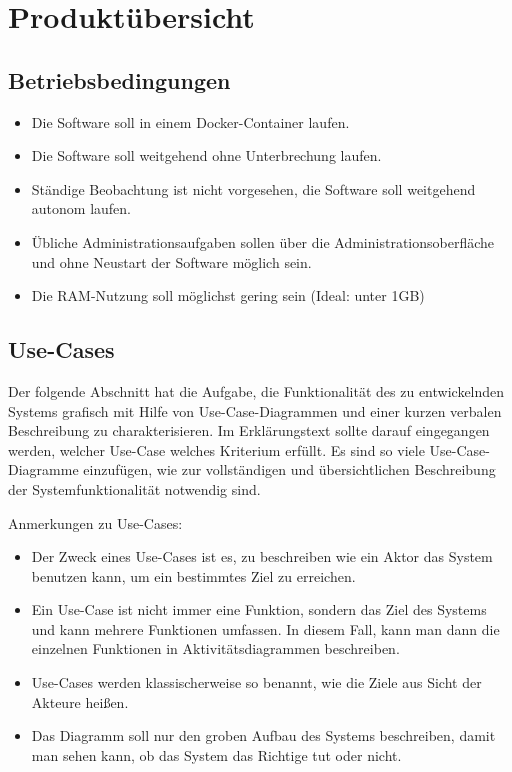 
\chapter{Produktübersicht}
\label{chap:product_overview}

\section{Betriebsbedingungen}
\iffalse Hier werden die unterschiedlichen Bedürfnisse und Anforderungen an das Produkt
aufgelistet. Dies können folgenden Punkte sein: \fi
\begin{itemize}
    \item Die Software soll in einem Docker-Container laufen.
    \item Die Software soll weitgehend ohne Unterbrechung laufen.
    \item Ständige Beobachtung ist nicht vorgesehen, die Software soll weitgehend autonom laufen.
    \item Übliche Administrationsaufgaben sollen über die Administrationsoberfläche und ohne Neustart der Software möglich sein.
    \item Die RAM-Nutzung soll möglichst gering sein (Ideal: unter 1GB)
\end{itemize}

\section{Use-Cases}

Der folgende Abschnitt hat die Aufgabe, die Funktionalität des zu entwickelnden
Systems grafisch mit Hilfe von Use-Case-Diagrammen und einer kurzen verbalen
Beschreibung zu charakterisieren. Im Erklärungstext sollte darauf eingegangen werden,
welcher Use-Case welches Kriterium erfüllt. Es sind so viele Use-Case-Diagramme einzufügen,
wie zur vollständigen und übersichtlichen Beschreibung der Systemfunktionalität
notwendig sind. 

Anmerkungen zu Use-Cases:

\begin{itemize}
	\item Der Zweck eines Use-Cases ist es, zu beschreiben wie ein Aktor das System benutzen kann,
	 	um ein bestimmtes Ziel zu erreichen.
	\item Ein Use-Case ist nicht immer eine Funktion, sondern das Ziel des Systems und kann mehrere 
		Funktionen umfassen.
		In diesem Fall, kann man dann die einzelnen Funktionen in Aktivitätsdiagrammen beschreiben.
	\item Use-Cases werden klassischerweise so benannt, wie die Ziele aus Sicht der Akteure heißen.
	\item Das Diagramm soll nur den groben Aufbau des Systems beschreiben, damit man sehen kann,
		 ob das System das Richtige tut oder nicht.
\end{itemize}


